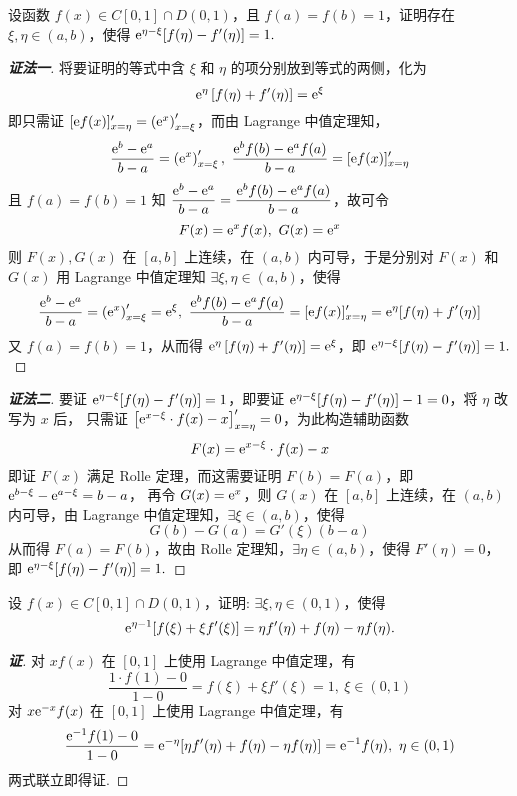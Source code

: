 \begin{example}
    设函数 $f(x)\in C[0,1]\cap D(0,1)$，且 $f(a)=f(b)=1$，证明存在 $\xi,\eta\in(a,b)$，使得 $\mathrm{e} ^{\eta-\xi}[f(\eta)-f'(\eta)]=1.$
\end{example}
\begin{proof}[{\songti \textbf{证法一}}]
    将要证明的等式中含 $\xi$ 和 $\eta$ 的项分别放到等式的两侧，化为
    $$\mathrm{e} ^{\eta }\left[ f(\eta)  +f'(\eta)  \right] =\mathrm{e} ^{\xi }$$
    即只需证 $[\mathrm{e} f(x)]'_{x=\eta}=\left(\mathrm{e} ^x\right)'_{x=\xi}$，而由 Lagrange 中值定理知，
    $$\dfrac{\mathrm{e} ^b-\mathrm{e} ^a}{b-a}=\left(\mathrm{e} ^x\right)'_{x=\xi},~\dfrac{\mathrm{e} ^bf(b)-\mathrm{e} ^af(a)}{b-a}=[\mathrm{e} f(x)]'_{x=\eta}$$
    且 $f(a)=f(b)=1$ 知 $\dfrac{\mathrm{e} ^b-\mathrm{e} ^a}{b-a}=\dfrac{\mathrm{e} ^bf(b)-\mathrm{e} ^af(a)}{b-a}$，故可令
    $$F(x)=\mathrm{e} ^xf(x),~G(x)=\mathrm{e} ^x$$
    则 $F(x),G(x)$ 在 $[a,b]$ 上连续，在 $(a,b)$ 内可导，于是分别对 $F(x)$ 和 $G(x)$ 用 Lagrange 中值定理知
    $\exists\xi,\eta\in(a,b)\text{，使得 }$
    $$\dfrac{\mathrm{e} ^b-\mathrm{e} ^a}{b-a}=\left(\mathrm{e} ^x\right)'_{x=\xi}=\mathrm{e} ^\xi,~\dfrac{\mathrm{e} ^bf(b)-\mathrm{e} ^af(a)}{b-a}=[\mathrm{e} f(x)]'_{x=\eta}=\mathrm{e} ^\eta[f(\eta)+f'(\eta)]$$
    又 $f(a)=f(b)=1$，从而得 $\mathrm{e} ^{\eta }\left[ f(\eta)  +f'(\eta)  \right] =\mathrm{e} ^{\xi }$，即 $\mathrm{e} ^{\eta-\xi}[f(\eta)-f'(\eta)]=1.$
\end{proof}
\begin{proof}[{\songti \textbf{证法二}}]
    要证 $\mathrm{e} ^{\eta-\xi}[f(\eta)-f'(\eta)]=1$，即要证 $\mathrm{e} ^{\eta-\xi}[f(\eta)-f'(\eta)]-1=0$，将 $\eta$ 改写为 $x$ 后，
    只需证 $\left[\mathrm{e} ^{x-\xi}\cdot f(x)-x\right]'_{x=\eta}=0$，为此构造辅助函数
    $$F(x)=\mathrm{e} ^{x-\xi}\cdot f(x)-x$$
    即证 $F(x)$ 满足 Rolle 定理，而这需要证明 $F(b)=F(a)$，即 $\mathrm{e} ^{b-\xi}-\mathrm{e} ^{a-\xi}=b-a$，
    再令 $G(x)=\mathrm{e} ^x$，则 $G(x)$ 在 $[a,b]$ 上连续，在 $(a,b)$ 内可导，由 Lagrange 中值定理知，$\exists\xi\in(a,b)\text{，使得 }$
    $$G(b)-G(a)=G'(\xi)(b-a)$$
    从而得 $F(a)=F(b)$，故由 Rolle 定理知，$\exists\eta\in(a,b)\text{，使得 }F'(\eta)=0$，
    即 $\mathrm{e} ^{\eta-\xi}[f(\eta)-f'(\eta)]=1.$
\end{proof}

\begin{example}
    设 $f(x)\in C[0,1]\cap D(0,1)$，证明: $\exists\xi,\eta\in(0,1)$，使得 $$\mathrm{e}^{\eta-1}\qty[f(\xi)+\xi f'(\xi)]=\eta f'(\eta)+f(\eta)-\eta f(\eta).$$
\end{example}
\begin{proof}[{\songti \textbf{证}}]
    对 $xf(x)$ 在 $[0,1]$ 上使用 Lagrange 中值定理，有
    $$\dfrac{1\cdot f(1)-0}{1-0}=f(\xi)+\xi f'(\xi)=1,~\xi\in(0,1)$$
    对 $x\mathrm{e}^{-x}f(x)$ 在 $[0,1]$ 上使用 Lagrange 中值定理，有
    $$\dfrac{\mathrm{e}^{-1}f(1)-0}{1-0}=\mathrm{e}^{-\eta}\qty[\eta f'(\eta)+f(\eta)-\eta f(\eta)]=\mathrm{e}^{-1}f(\eta),~\eta\in(0,1)$$
    两式联立即得证.
\end{proof}

